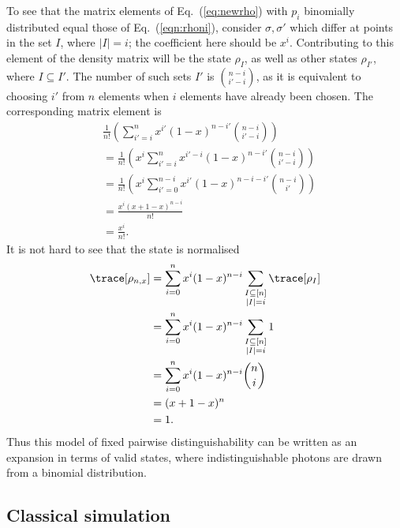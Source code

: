 To see that the matrix elements of Eq.~(\ref{eq:newrho}) with $p_i$ binomially distributed equal those of Eq.~(\ref{eqn:rhoni}), consider  $\sigma,\sigma'$ which differ at points in the set $I$, where $|I|=i$; the coefficient here should be $x^i$.
Contributing to this element of the density matrix will be the state $\rho_I$, as well as other states $\rho_{I'}$, where $I \subseteq I'$. 
The number of such sets $I'$ is $\binom{n-i}{i'-i}$, as it is equivalent to choosing $i'$ from $n$ elements when $i$ elements have already been chosen. 
The corresponding matrix element is
\begin{align}
&\frac{1}{n!}\left(\sum_{{i'}=i}^n x^{i'}(1-x)^{n-{i'}}\binom{n-i}{{i'}-i}\right) \\
&= \frac{1}{n!}\left(x^i\sum_{{i'}=i}^n x^{{i'}-i}(1-x)^{n-{i'}}\binom{n-i}{{i'}-i}\right)\\
&= \frac{1}{n!}\left( x^i\sum_{{i'}=0}^{n-i}x^{i'}(1-x)^{n-i-{i'}}\binom{n-i}{{i'}}\right)\\
&= \frac{x^i(x + 1 - x)^{n-i}}{n!}\\
&= \frac{x^i}{n!}.
\end{align}
It is not hard to see that the state is normalised
\begin{align}
\trace[\rho_{n,x}] &= \sum_{i=0}^nx^i(1-x)^{n-i}\sum_{\substack{I\subseteq[n]\\|I|=i}}\trace[\rho_I]\\
&= \sum_{i=0}^nx^i(1-x)^{n-i}\sum_{\substack{I\subseteq[n]\\|I|=i}}1\\
&= \sum_{i=0}^nx^i(1-x)^{n-i}\binom{n}{i}\\
&= (x + 1 - x)^n\\
&= 1.
\end{align}
Thus this model of fixed pairwise distinguishability can be written as an expansion in terms of valid states, where indistinguishable photons are drawn from a binomial distribution.


\subsection{Classical simulation} %

